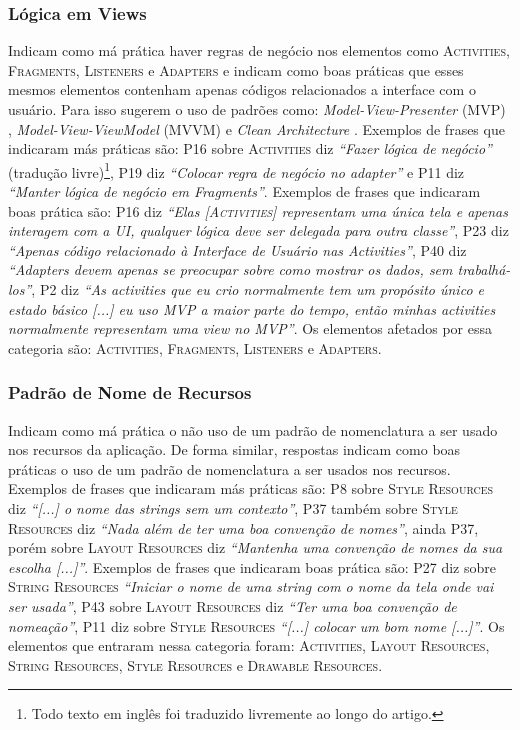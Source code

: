 \subsubsection{Lógica em Views}
Indicam como má prática haver regras de negócio nos elementos como \textsc{Activities}, \textsc{Fragments}, \textsc{Listeners} e \textsc{Adapters} e indicam como boas práticas que esses mesmos elementos contenham apenas códigos relacionados a interface com o usuário. Para isso sugerem o uso de padrões como: \textit{Model-View-Presenter} (MVP) \cite{MartinFowlerGUIArchitectures, WikipediaMVP}, \textit{Model-View-ViewModel} (MVVM) \cite{WikipediaMVVM} e \textit{Clean Architecture} \cite{CleanArchitecture}. Exemplos de frases que indicaram más práticas são: P16 sobre \textsc{Activities} diz \textit{``Fazer lógica de negócio''} (tradução livre)\footnote{Todo texto em inglês foi traduzido livremente ao longo do artigo.}, P19 diz \textit{``Colocar regra de negócio no adapter''} e P11 diz \textit{``Manter lógica de negócio em Fragments''}. Exemplos de frases que indicaram boas prática são: P16 diz \textit{``Elas [\textsc{Activities}] representam uma única tela e apenas interagem com a UI, qualquer lógica deve ser delegada para outra classe''}, P23 diz \textit{``Apenas código relacionado à Interface de Usuário nas Activities''}, P40 diz \textit{``Adapters devem apenas se preocupar sobre como mostrar os dados, sem trabalhá-los''}, P2 diz \textit{``As activities que eu crio normalmente tem um propósito único e estado básico [...] eu uso MVP a maior parte do tempo, então minhas activities normalmente representam uma view no MVP''}. Os elementos afetados por essa categoria são: \textsc{Activities}, \textsc{Fragments}, \textsc{Listeners} e \textsc{Adapters}. 

\subsubsection{Padrão de Nome de Recursos}
Indicam como má prática o não uso de um padrão de nomenclatura a ser usado nos recursos da aplicação. De forma similar, respostas indicam como boas práticas o uso de um padrão de nomenclatura a ser usados nos recursos. Exemplos de frases que indicaram más práticas são: P8 sobre \textsc{Style Resources} diz \textit{``[...] o nome das strings sem um contexto''}, P37 também sobre \textsc{Style Resources} diz \textit{``Nada além de ter uma boa convenção de nomes''}, ainda P37, porém sobre \textsc{Layout Resources} diz \textit{``Mantenha uma convenção de nomes da sua escolha [...]''}. Exemplos de frases que indicaram boas prática são: P27 diz sobre \textsc{String Resources} \textit{``Iniciar o nome de uma string com o nome da tela onde vai ser usada''}, P43 sobre \textsc{Layout Resources} diz \textit{``Ter uma boa convenção de nomeação''}, P11 diz sobre \textsc{Style Resources} \textit{``[...] colocar um bom nome [...]''}. Os elementos que entraram nessa categoria foram: \textsc{Activities}, \textsc{Layout Resources}, \textsc{String Resources}, \textsc{Style Resources} e \textsc{Drawable Resources}. 

